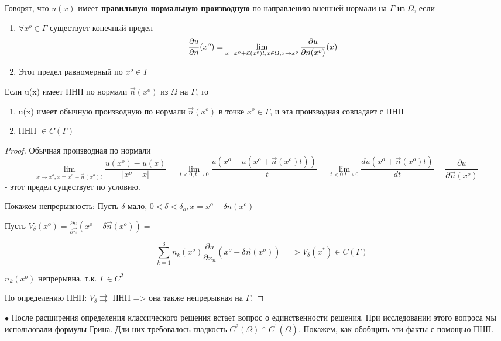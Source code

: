 \begin{definition}
Говорят, что $u(x)$ имеет \textbf{правильную нормальную производную} по направлению внешней нормали на $\Gamma$ из $\Omega$, если  
\begin{enumerate}
\item $\forall x^o \in \Gamma$ существует конечный предел 
$$\frac{\partial u}{\partial \vec{n}}(x^o) \equiv \lim_{x = x^o + \vec{n}(x^o)t,\\ x \in \Omega, \\ x \to x^o} \frac{\partial u}{\partial \vec{n}(x^o)}(x)$$

\item Этот предел равномерный по $x^o \in \Gamma$
\end{enumerate}
\end{definition}
\begin{lemma}
Если u(x) имеет ПНП по нормали $\vec{n}(x^o)$ из $\Omega$ на $\Gamma$, то 
\begin{enumerate}
\item u(x) имеет обычную производную по нормали $\vec{n}(x^o)$ в точке $x^o \in \Gamma$, и эта производная совпадает с ПНП 

\item ПНП $\in C(\Gamma)$
\end{enumerate}
\end{lemma}
\begin{proof} Обычная производная по нормали $$\lim_{x \to x^o, x = x^o + \vec{n}(x^o)t} \frac{u(x^o) - u(x)}{|x^o - x|} = \lim_{t < 0, t \to 0} \frac{u(x^o - u(x^o + \vec{n}(x^o)t))}{-t} = \lim_{t < 0. t \to 0} \frac{du(x^o + \vec{n}(x^o)t)}{dt} = \frac{\partial u}{\partial \vec{n}(x^o)}$$ - этот предел существует по условию.

Покажем непрерывность: Пусть $\delta$ мало, $0 < \delta < \delta_o, x = x^o - \delta n(x^o)$

Пусть $V_{\delta}(x^o) = \frac{\partial u}{\partial \vec{n}}(x^o - \delta \vec{n}(x^o))= $

$$=\sum_{k=1}^{3} n_k(x^o)\frac{\partial u}{\partial x_n}(x^o - \delta \vec{n}(x^o)) => V_{\delta}(x^*) \in C(\Gamma) $$

$n_k(x^o)$ непрерывна, т.к. $\Gamma \in C^2$

По определению ПНП: $V_{\delta} \rightrightarrows $ ПНП => она также непрерывная на $\Gamma$. 
\end{proof}
$\bullet$ После расширения определения классического решения встает вопрос о единственности решения. При исследовании этого вопроса мы использовали формулы Грина. Дли них требовалось гладкость $C^2(\Omega) \cap C^1(\bar{\Omega})$. Покажем, как обобщить эти факты с помощью ПНП.

